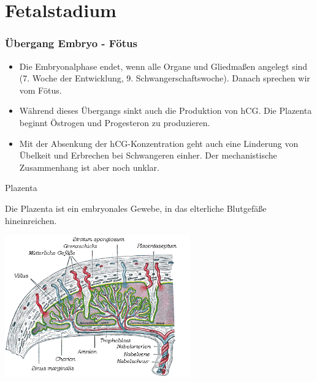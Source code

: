\documentclass{beamer}
\begin{document}
\section{Fetalstadium}

\begin{frame}
\frametitle{Übergang Embryo - Fötus}
\begin{itemize}
    \item 
    Die Embryonalphase endet, wenn alle Organe und Gliedmaßen angelegt sind (7. Woche der Entwicklung, 9. Schwangerschaftswoche). Danach sprechen wir vom Fötus.  

\pause
\item 
Während dieses Übergangs sinkt auch die Produktion von hCG. Die Plazenta beginnt Östrogen und Progesteron zu produzieren. 


\pause
\item 
Mit der Absenkung der hCG-Konzentration geht auch eine Linderung von Übelkeit und Erbrechen bei Schwangeren einher. Der mechanistische Zusammenhang ist aber noch unklar.


    
\end{itemize}


 
\end{frame}





\begin{frame}{Plazenta}

Die Plazenta ist ein embryonales Gewebe, in das elterliche Blutgefäße hineinreichen. 

\begin{center}
\includegraphics[width=0.6\textwidth]{Plazenta.png}
    
\end{center}


    
\end{frame}
\end{document}
